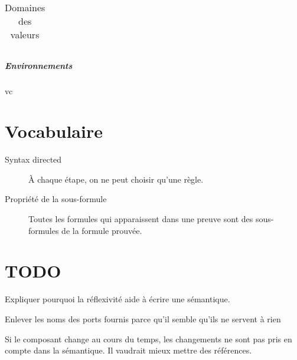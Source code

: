 \documentclass[11pt,a4paper,fleqn]{report}
\begin{document}
\begin{appendices}
\begin{table}[!h]
\begin{center}
\begin{tabular}{|c|c|l|l|}
\hline
\end{tabular}
\end{center}
\label{tab:DomVal}
\caption{Domaines des valeurs}
\end{table}


\paragraph{Environnements}
vc
\chapter{Vocabulaire}
\begin{description}
\item[Syntax directed] À chaque étape, on ne peut choisir qu'une règle.
\item[Propriété de la sous-formule] Toutes les formules qui apparaissent dans une preuve sont des sous-formules de la formule prouvée.
\end{description}


\chapter{TODO}
Expliquer pourquoi la réflexivité aide à écrire une sémantique.

Enlever les noms des ports fournis parce qu'il semble qu'ils ne servent à rien

Si le composant change au cours du temps, les changements ne sont pas pris en compte dans la sémantique. Il vaudrait mieux mettre des références.
\end{appendices}
\cite{SDT14}
\cite{Spa13}



\end{document}
